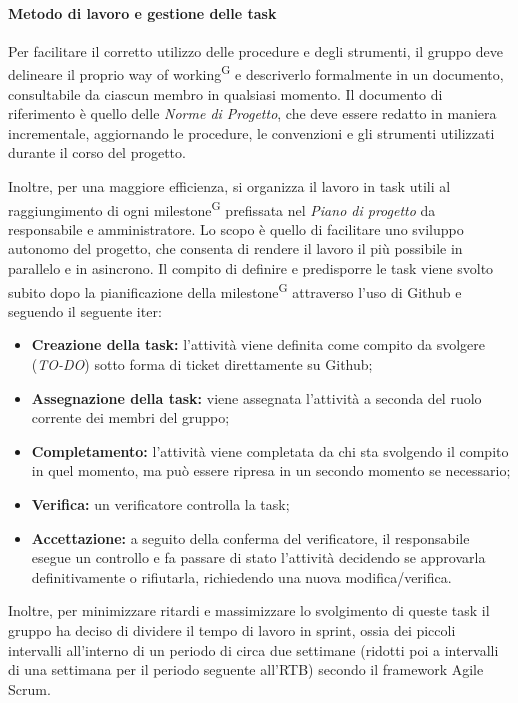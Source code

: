 \paragraph{Metodo di lavoro e gestione delle task}\label{sec:pianificazione:gestione_task}
Per facilitare il corretto utilizzo delle procedure e degli strumenti, il gruppo deve delineare il proprio way of working\textsuperscript{G} e descriverlo formalmente in un documento, consultabile da ciascun membro in qualsiasi momento.  Il documento di riferimento è quello delle \textit{Norme di Progetto}, che deve essere redatto in maniera incrementale, aggiornando le procedure, le convenzioni e gli strumenti utilizzati durante il corso del progetto.

Inoltre, per una maggiore efficienza, si organizza il lavoro in task utili al raggiungimento di ogni milestone\textsuperscript{G} prefissata nel \textit{Piano di progetto} da responsabile e amministratore. %
Lo scopo è quello di facilitare uno sviluppo autonomo del progetto, che consenta di rendere il lavoro il più possibile in parallelo e in asincrono.
Il compito di definire e predisporre le task viene svolto subito dopo la pianificazione della milestone\textsuperscript{G} attraverso l'uso di Github e seguendo il seguente iter:
\begin{itemize}
    \item \textbf{Creazione della task:} l'attività viene definita come compito da svolgere (\textit{TO-DO}) sotto forma di ticket direttamente su Github;
    \item \textbf{Assegnazione della task:} viene assegnata l'attività a seconda del ruolo corrente dei membri del gruppo;
    \item \textbf{Completamento:} l'attività viene completata da chi sta svolgendo il compito in quel momento, ma può essere ripresa in un secondo momento se necessario;
    \item \textbf{Verifica:} un verificatore controlla la task;
    \item \textbf{Accettazione:} a seguito della conferma del verificatore, il responsabile esegue un controllo e fa passare di stato l'attività decidendo se approvarla definitivamente o rifiutarla, richiedendo una nuova modifica/verifica.
\end{itemize}
Inoltre, per minimizzare ritardi e massimizzare lo svolgimento di queste task il gruppo ha deciso di dividere il tempo di lavoro in sprint, ossia dei piccoli intervalli all'interno di un periodo di circa due settimane (ridotti poi a intervalli di una settimana per il periodo seguente all'RTB) secondo il framework Agile Scrum.
